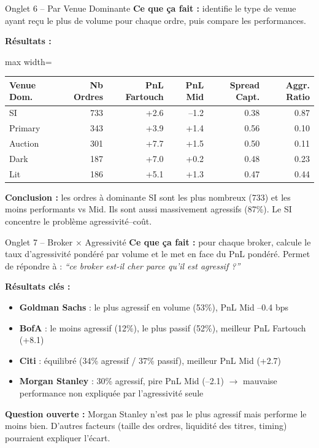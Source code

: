 \documentclass[10pt]{beamer}
\begin{document}
\begin{frame}{Onglet 6 -- Par Venue Dominante}
\textbf{Ce que ça fait :} identifie le type de venue ayant reçu le plus de volume pour chaque ordre, puis compare les performances.

\vspace{0.2cm}
\textbf{Résultats :}

\begin{adjustbox}{max width=\textwidth}
\begin{tabular}{lrrrrr}
\toprule
Venue Dom. & Nb Ordres & PnL Fartouch & PnL Mid & Spread Capt. & Aggr. Ratio \\
\midrule
SI & 733 & +2.6 & --1.2 & 0.38 & 0.87 \\
Primary & 343 & +3.9 & +1.4 & 0.56 & 0.10 \\
Auction & 301 & +7.7 & +1.5 & 0.50 & 0.11 \\
Dark & 187 & +7.0 & +0.2 & 0.48 & 0.23 \\
Lit & 186 & +5.1 & +1.3 & 0.47 & 0.44 \\
\bottomrule
\end{tabular}
\end{adjustbox}

\vspace{0.3cm}
\textbf{Conclusion :} les ordres à dominante SI sont les plus nombreux (733) et les moins performants vs Mid. Ils sont aussi massivement agressifs (87\%). Le SI concentre le problème agressivité--coût.
\end{frame}

\begin{frame}{Onglet 7 -- Broker $\times$ Agressivité}
\textbf{Ce que ça fait :} pour chaque broker, calcule le taux d'agressivité pondéré par volume et le met en face du PnL pondéré. Permet de répondre à : \textit{``ce broker est-il cher parce qu'il est agressif ?''}

\vspace{0.2cm}
\textbf{Résultats clés :}
\begin{itemize}
    \item \textbf{Goldman Sachs} : le plus agressif en volume (53\%), PnL Mid --0.4 bps
    \item \textbf{BofA} : le moins agressif (12\%), le plus passif (52\%), meilleur PnL Fartouch (+8.1)
    \item \textbf{Citi} : équilibré (34\% agressif / 37\% passif), meilleur PnL Mid (+2.7)
    \item \textbf{Morgan Stanley} : 30\% agressif, pire PnL Mid (--2.1) $\rightarrow$ mauvaise performance non expliquée par l'agressivité seule
\end{itemize}

\vspace{0.2cm}
\textbf{Question ouverte :} Morgan Stanley n'est pas le plus agressif mais performe le moins bien. D'autres facteurs (taille des ordres, liquidité des titres, timing) pourraient expliquer l'écart.
\end{frame}
\end{document}
